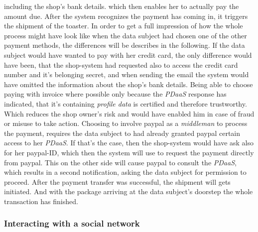 \documentclass[12pt,english,a4paper,titlepage,cleardoublepage=empty,dottedtoc]{report}
\begin{document}
including the shop's bank details. which then enables her to actually
pay the amount due. After the system recognizes the payment has coming
in, it triggers the shipment of the toaster. In order to get a full
impression of how the whole process might have look like when the data
subject had chosen one of the other payment methods, the differences
will be describes in the following. If the data subject would have
wanted to pay with her credit card, the only difference would have been,
that the shop-system had requested also to access the credit card number
and it's belonging secret, and when sending the email the system would
have omitted the information about the shop's bank details. Being able
to choose paying with invoice where possible only because the
\emph{PDaaS} response has indicated, that it's containing \emph{profile
data} is certified and therefore trustworthy. Which reduces the shop
owner's risk and would have enabled him in case of fraud or misuse to
take action. Choosing to involve paypal as a \emph{middleman} to process
the payment, requires the data subject to had already granted paypal
certain access to her \emph{PDaaS}. If that's the case, then the
shop-system would have ask also for her paypal-ID, which then the system
will use to request the payment directly from paypal. This on the other
side will cause paypal to consult the \emph{PDaaS}, which results in a
second notification, asking the data subject for permission to proceed.
After the payment transfer was successful, the shipment will gets
initiated. And with the package arriving at the data subject's doorstep
the whole transaction has finished.

\subsubsection{Interacting with a social
network}\label{interacting-with-a-social-network}
\end{document}
